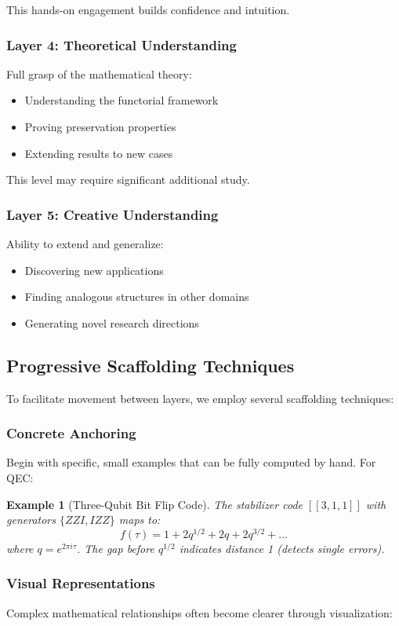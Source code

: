 \documentclass[11pt,a4paper]{article}
\newtheorem{example}[theorem]{Example}
\begin{document}
This hands-on engagement builds confidence and intuition.

\subsubsection{Layer 4: Theoretical Understanding}
Full grasp of the mathematical theory:
\begin{itemize}
\item Understanding the functorial framework
\item Proving preservation properties
\item Extending results to new cases
\end{itemize}

This level may require significant additional study.

\subsubsection{Layer 5: Creative Understanding}
Ability to extend and generalize:
\begin{itemize}
\item Discovering new applications
\item Finding analogous structures in other domains
\item Generating novel research directions
\end{itemize}

\subsection{Progressive Scaffolding Techniques}

To facilitate movement between layers, we employ several scaffolding techniques:

\subsubsection{Concrete Anchoring}
Begin with specific, small examples that can be fully computed by hand. For QEC:

\begin{example}[Three-Qubit Bit Flip Code]
The stabilizer code $[[3,1,1]]$ with generators $\{ZZI, IZZ\}$ maps to:
$$f(τ) = 1 + 2q^{1/2} + 2q + 2q^{3/2} + \ldots$$
where $q = e^{2\pi i τ}$. The gap before $q^{1/2}$ indicates distance 1 (detects single errors).
\end{example}

\subsubsection{Visual Representations}
Complex mathematical relationships often become clearer through visualization:
\end{document}
